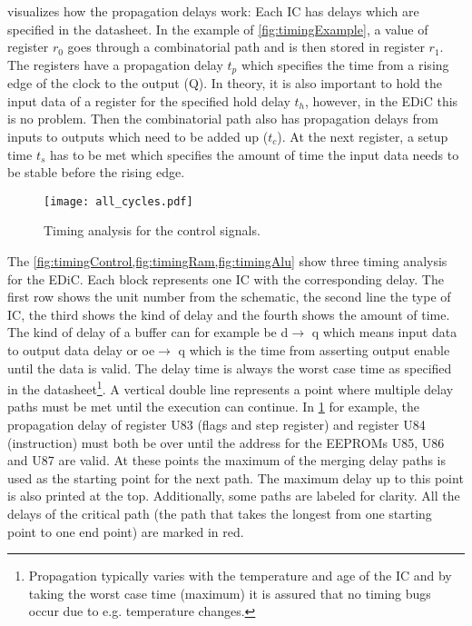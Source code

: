  visualizes how the propagation delays work:
Each \gls{IC} has delays which are specified in the datasheet.
In the example of \cref{fig:timingExample}, a value of register $r_0$ goes through a combinatorial path and is then stored in register $r_1$.
The registers have a propagation delay $t_p$ which specifies the time from a rising edge of the clock to the output (Q).
In theory, it is also important to hold the input data of a register for the specified hold delay $t_h$, however, in the \gls{EDiC} this is no problem.
Then the combinatorial path also has propagation delays from inputs to outputs which need to be added up ($t_c$).
At the next register, a setup time $t_s$ has to be met which specifies the amount of time the input data needs to be stable before the rising edge.

\begin{figure}[t]
  \centering
  \texttt{[image: all\_cycles.pdf]}
  \caption{Timing analysis for the control signals.}
  \label{fig:timingControl}
\end{figure}
The \cref{fig:timingControl,fig:timingRam,fig:timingAlu} show three timing analysis for the \gls{EDiC}.
Each block represents one \gls{IC} with the corresponding delay.
The first row shows the unit number from the schematic, the second line the type of \gls{IC}, the third shows the kind of delay and the fourth shows the amount of time.
The kind of delay of a buffer can for example be d$\rightarrow$ q which means input data to output data delay or oe$\rightarrow$ q which is the time from asserting output enable until the data is valid.
The delay time is always the worst case time as specified in the datasheet\footnote{Propagation typically varies with the temperature and age of the \gls{IC} and by taking the worst case time (maximum) it is assured that no timing bugs occur due to e.g. temperature changes.}.
A vertical double line represents a point where multiple delay paths must be met until the execution can continue.
In \cref{fig:timingControl} for example, the propagation delay of register U83 (flags and step register) and register U84 (instruction) must both be over until the address for the \glspl{EEPROM} U85, U86 and U87 are valid.
At these points the maximum of the merging delay paths is used as the starting point for the next path.
The maximum delay up to this point is also printed at the top.
Additionally, some paths are labeled for clarity.
All the delays of the critical path (the path that takes the longest from one starting point to one end point) are marked in red.

